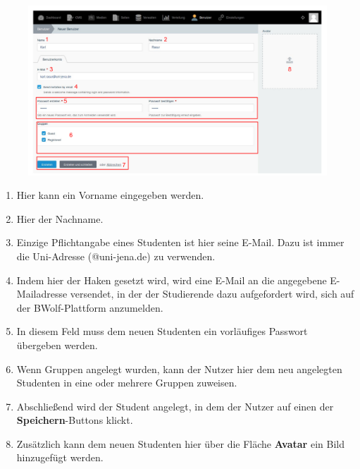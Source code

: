   
  \begin{figure}
  	\centering
  	\includegraphics[scale=0.5]{backend/img/neuer_benutzer.pdf}
  \end{figure}
  \begin{enumerate}
   \item Hier kann ein Vorname eingegeben werden.
   \item Hier der Nachname.
   \item Einzige Pflichtangabe eines Studenten ist hier seine E-Mail. Dazu ist immer die Uni-Adresse (@uni-jena.de) zu verwenden.
   \item Indem hier der Haken gesetzt wird, wird eine E-Mail an die angegebene E-Mailadresse versendet, in der der Studierende dazu aufgefordert wird, sich auf der BWolf-Plattform anzumelden.
   \item In diesem Feld muss dem neuen Studenten ein vorläufiges Passwort übergeben werden.
   \item Wenn Gruppen angelegt wurden, kann der Nutzer hier dem neu angelegten Studenten in eine oder mehrere Gruppen zuweisen.
   \item Abschließend wird der Student angelegt, in dem der Nutzer auf einen der \textbf{Speichern}-Buttons klickt.
   \item Zusätzlich kann dem neuen Studenten hier über die Fläche \textbf{Avatar} ein Bild hinzugefügt werden.
  \end{enumerate}

